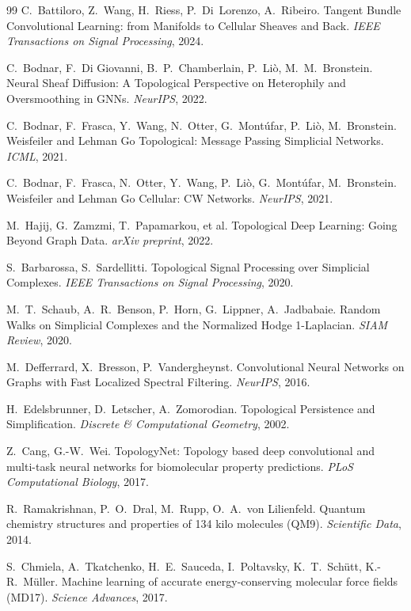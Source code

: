 \documentclass[pdflatex,sn-mathphys-num]{sn-jnl}%
\theoremstyle{thmstyleone}
\theoremstyle{thmstyletwo}
\theoremstyle{thmstylethree}
\begin{document}
\begin{thebibliography}{99}
 C.~Battiloro, Z.~Wang, H.~Riess, P.~Di~Lorenzo, A.~Ribeiro. Tangent Bundle Convolutional Learning: from Manifolds to Cellular Sheaves and Back. \emph{IEEE Transactions on Signal Processing}, 2024.

 C.~Bodnar, F.~Di Giovanni, B.~P.~Chamberlain, P.~Li\`o, M.~M.~Bronstein. Neural Sheaf Diffusion: A Topological Perspective on Heterophily and Oversmoothing in GNNs. \emph{NeurIPS}, 2022.

 C.~Bodnar, F.~Frasca, Y.~Wang, N.~Otter, G.~Mont\'ufar, P.~Li\`o, M.~Bronstein. Weisfeiler and Lehman Go Topological: Message Passing Simplicial Networks. \emph{ICML}, 2021.

 C.~Bodnar, F.~Frasca, N.~Otter, Y.~Wang, P.~Li\`o, G.~Mont\'ufar, M.~Bronstein. Weisfeiler and Lehman Go Cellular: CW Networks. \emph{NeurIPS}, 2021.

 M.~Hajij, G.~Zamzmi, T.~Papamarkou, et al. Topological Deep Learning: Going Beyond Graph Data. \emph{arXiv preprint}, 2022.

 S.~Barbarossa, S.~Sardellitti. Topological Signal Processing over Simplicial Complexes. \emph{IEEE Transactions on Signal Processing}, 2020.

 M.~T.~Schaub, A.~R.~Benson, P.~Horn, G.~Lippner, A.~Jadbabaie. Random Walks on Simplicial Complexes and the Normalized Hodge 1-Laplacian. \emph{SIAM Review}, 2020.

 M.~Defferrard, X.~Bresson, P.~Vandergheynst. Convolutional Neural Networks on Graphs with Fast Localized Spectral Filtering. \emph{NeurIPS}, 2016.

 H.~Edelsbrunner, D.~Letscher, A.~Zomorodian. Topological Persistence and Simplification. \emph{Discrete \& Computational Geometry}, 2002.

 Z.~Cang, G.-W.~Wei. TopologyNet: Topology based deep convolutional and multi-task neural networks for biomolecular property predictions. \emph{PLoS Computational Biology}, 2017.

 R.~Ramakrishnan, P.~O.~Dral, M.~Rupp, O.~A.~von Lilienfeld. Quantum chemistry structures and properties of 134 kilo molecules (QM9). \emph{Scientific Data}, 2014.

 S.~Chmiela, A.~Tkatchenko, H.~E.~Sauceda, I.~Poltavsky, K.~T.~Sch\"utt, K.-R.~M\"uller. Machine learning of accurate energy-conserving molecular force fields (MD17). \emph{Science Advances}, 2017.

\end{thebibliography}
\end{document}
